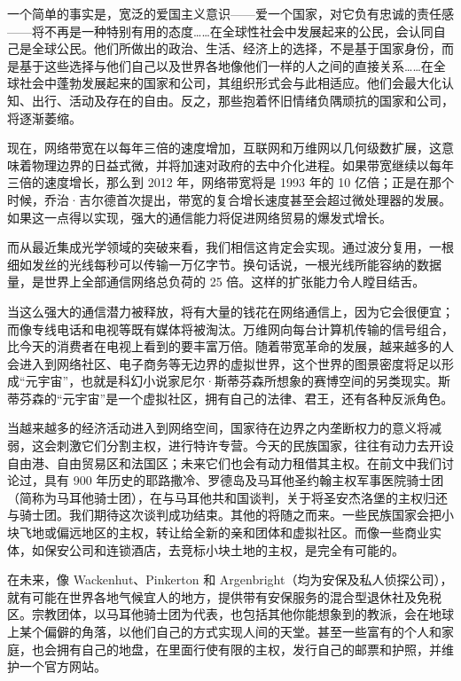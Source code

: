 \begin{tcolorbox}
一个简单的事实是，宽泛的爱国主义意识——爱一个国家，对它负有忠诚的责任感——将不再是一种特别有用的态度……在全球性社会中发展起来的公民，会认同自己是全球公民。他们所做出的政治、生活、经济上的选择，不是基于国家身份，而是基于这些选择与他们自己以及世界各地像他们一样的人之间的直接关系……在全球社会中蓬勃发展起来的国家和公司，其组织形式会与此相适应。他们会最大化认知、出行、活动及存在的自由。反之，那些抱着怀旧情绪负隅顽抗的国家和公司，将逐渐萎缩。
\end{tcolorbox}

现在，网络带宽在以每年三倍的速度增加，互联网和万维网以几何级数扩展，这意味着物理边界的日益式微，并将加速对政府的去中介化进程。如果带宽继续以每年三倍的速度增长，那么到 2012 年，网络带宽将是 1993 年的 10 亿倍；正是在那个时候，乔治·吉尔德首次提出，带宽的复合增长速度甚至会超过微处理器的发展。如果这一点得以实现，强大的通信能力将促进网络贸易的爆发式增长。

而从最近集成光学领域的突破来看，我们相信这肯定会实现。通过波分复用，一根细如发丝的光线每秒可以传输一万亿字节。换句话说，一根光线所能容纳的数据量，是世界上全部通信网络总负荷的 25 倍。这样的扩张能力令人瞠目结舌。

当这么强大的通信潜力被释放，将有大量的钱花在网络通信上，因为它会很便宜；而像专线电话和电视等既有媒体将被淘汰。万维网向每台计算机传输的信号组合，比今天的消费者在电视上看到的要丰富万倍。随着带宽革命的发展，越来越多的人会进入到网络社区、电子商务等无边界的虚拟世界，这个世界的图景密度将足以形成“元宇宙”，也就是科幻小说家尼尔·斯蒂芬森所想象的赛博空间的另类现实。斯蒂芬森的“元宇宙”是一个虚拟社区，拥有自己的法律、君王，还有各种反派角色。

当越来越多的经济活动进入到网络空间，国家待在边界之内垄断权力的意义将减弱，这会刺激它们分割主权，进行特许专营。今天的民族国家，往往有动力去开设自由港、自由贸易区和法国区；未来它们也会有动力租借其主权。在前文中我们讨论过，具有 900 年历史的耶路撒冷、罗德岛及马耳他圣约翰主权军事医院骑士团（简称为马耳他骑士团），在与马耳他共和国谈判，关于将圣安杰洛堡的主权归还与骑士团。我们期待这次谈判成功结束。其他的将随之而来。一些民族国家会把小块飞地或偏远地区的主权，转让给全新的亲和团体和虚拟社区。而像一些商业实体，如保安公司和连锁酒店，去竞标小块土地的主权，是完全有可能的。

在未来，像 Wackenhut、Pinkerton 和 Argenbright（均为安保及私人侦探公司），就有可能在世界各地气候宜人的地方，提供带有安保服务的混合型退休社及免税区。宗教团体，以马耳他骑士团为代表，也包括其他你能想象到的教派，会在地球上某个偏僻的角落，以他们自己的方式实现人间的天堂。甚至一些富有的个人和家庭，也会拥有自己的地盘，在里面行使有限的主权，发行自己的邮票和护照，并维护一个官方网站。

